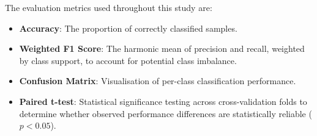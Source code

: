 The evaluation metrics used throughout this study are:
\begin{itemize}
    \item \textbf{Accuracy}: The proportion of correctly classified samples.
    \item \textbf{Weighted F1 Score}: The harmonic mean of precision and recall, weighted by class support, to account for potential class imbalance.
    \item \textbf{Confusion Matrix}: Visualisation of per-class classification performance.
    \item \textbf{Paired t-test}: Statistical significance testing across cross-validation folds to determine whether observed performance differences are statistically reliable ($p < 0.05$).
\end{itemize}
